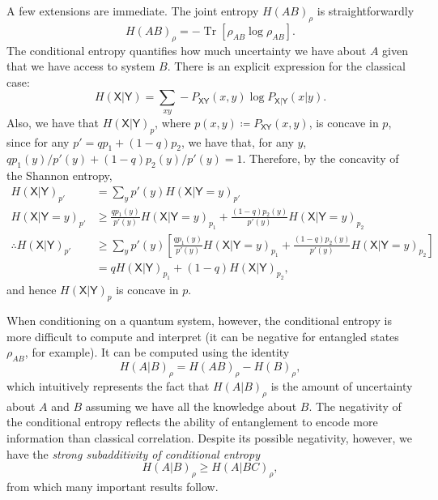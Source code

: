 \documentclass[10pt, a4paper]{article}
\numberwithin{equation}{section} %
\theoremstyle{definition}
\theoremstyle{plain}
\newcommand{\?}{\mathrel{?}} %
\newcommand{\Tr}[2][]{\mathop{\mathrm{Tr}#1}\left[ #2 \right]} %
\newcommand{\crv}[1]{\mathsf{#1}}
\begin{document}
\begin{appendices}
                    A few extensions are immediate. The joint entropy \(H{(AB)}_{\rho}\) is straightforwardly
                    \begin{equation}
                      H{(AB)}_{\rho} = -\Tr{\rho_{AB}\log\rho_{AB}}.
                    \end{equation}
                    The conditional entropy quantifies how much uncertainty we have about \(A\) given that we have access to system \(B\). There is an explicit expression for the classical case:
                    \begin{equation}
                      H(\crv{X}|\crv{Y}) = \sum_{xy} - P_{\crv{XY}}(x,y) \log P_{\crv{X}|\crv{Y}}(x|y).
                    \end{equation}
                    Also, we have that \(H{(\crv{X}|\crv{Y})}_p\), where \(p(x,y) \coloneqq P_{\crv{XY}}(x, y)\), is concave in \(p\), since for any \(p' = qp_1 + (1-q)p_2\), we have that, for any \(y\), \(qp_1(y)/p'(y) + (1-q)p_2(y)/p'(y) = 1\). Therefore, by the concavity of the Shannon entropy,
                  \begin{align}
                    H{(\crv{X}|\crv{Y})}_{p'} &= \sum_y p'(y) H{(\crv{X}|\crv{Y}=y)}_{p'} \\
                    H{(\crv{X}|\crv{Y}=y)}_{p'} &\geq \frac{qp_1(y)}{p'(y)}H{(\crv{X}|\crv{Y}=y)}_{p_1} + \frac{(1-q)p_2(y)}{p'(y)}H{(\crv{X}|\crv{Y}=y)}_{p_2} \\
                    \therefore H{(\crv{X}|\crv{Y})}_{p'} &\geq \sum_y p'(y) \left[ \frac{qp_1(y)}{p'(y)}H{(\crv{X}|\crv{Y}=y)}_{p_1} + \frac{(1-q)p_2(y)}{p'(y)}H{(\crv{X}|\crv{Y}=y)}_{p_2} \right] \\
                                                         &= qH{(\crv{X}|\crv{Y})}_{p_1} + (1-q)H{(\crv{X}|\crv{Y})}_{p_2},
                  \end{align}
                  and hence \(H{(\crv{X}|\crv{Y})}_p\) is concave in \(p\).

                  When conditioning on a quantum system, however, the conditional entropy is more difficult to compute and interpret (it can be negative for entangled states \(\rho_{AB}\), for example). It can be computed using the identity
                  \begin{equation}
                    H{(A|B)}_{\rho} = H{(AB)}_{\rho} - H{(B)}_{\rho},
                  \end{equation}
                  which intuitively represents the fact that \(H{(A|B)}_{\rho}\) is the amount of uncertainty about \(A\) and \(B\) assuming we have all the knowledge about \(B\). The negativity of the conditional entropy reflects the ability of entanglement to encode more information than classical correlation. Despite its possible negativity, however, we have the \emph{strong subadditivity of conditional entropy}
                  \begin{equation}
                    H{(A|B)}_{\rho} \geq H{(A|BC)}_{\rho},
                  \end{equation}
                  from which many important results follow.


\end{appendices}
\end{document}
